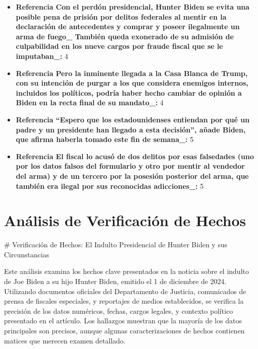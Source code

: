\documentclass[10pt,a4paper]{article}
\begin{document}
\begin{itemize}[leftmargin=*]
            \item \textbf{Referencia Con el perd\'{o}n presidencial, Hunter Biden se evita una posible pena de prisi\'{o}n por delitos federales al mentir en la declaraci\'{o}n de antecedentes y comprar y poseer ilegalmente un arma de fuego\_ Tambi\'{e}n queda exonerado de su admisi\'{o}n de culpabilidad en los nueve cargos por fraude fiscal que se le imputaban\_:} 4
            \item \textbf{Referencia Pero la inminente llegada a la Casa Blanca de Trump, con su intenci\'{o}n de purgar a los que considera enemigos internos, incluidos los pol\'{i}ticos, podr\'{i}a haber hecho cambiar de opini\'{o}n a Biden en la recta final de su mandato\_:} 4
            \item \textbf{Referencia ``Espero que los estadounidenses entiendan por qu\'{e} un padre y un presidente han llegado a esta decisi\'{o}n'', a\~{n}ade Biden, que afirma haberla tomado este fin de semana\_:} 5
            \item \textbf{Referencia El fiscal lo acus\'{o} de dos delitos por esas falsedades (uno por los datos falsos del formulario y otro por mentir al vendedor del arma) y de un tercero por la posesi\'{o}n posterior del arma, que tambi\'{e}n era ilegal por sus reconocidas adicciones\_:} 5
    \end{itemize}
\vspace{1em}


\section*{Análisis de Verificación de Hechos}
    \# Verificaci\'{o}n de Hechos: El Indulto Presidencial de Hunter Biden y sus Circunstancias
\par\medskip
Este an\'{a}lisis examina los hechos clave presentados en la noticia sobre el indulto de Joe Biden a su hijo Hunter Biden, emitido el 1 de diciembre de 2024. Utilizando documentos oficiales del Departamento de Justicia, comunicados de prensa de fiscales especiales, y reportajes de medios establecidos, se verifica la precisi\'{o}n de los datos num\'{e}ricos, fechas, cargos legales, y contexto pol\'{i}tico presentado en el art\'{i}culo. Los hallazgos muestran que la mayor\'{i}a de los datos principales son precisos, aunque algunas caracterizaciones de hechos contienen matices que merecen examen detallado. 
\end{document}
